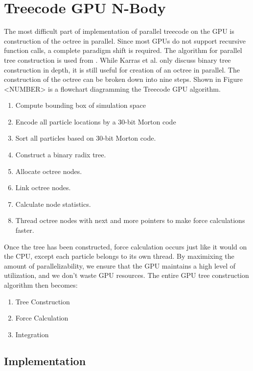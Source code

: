 \documentclass{thesis}
\begin{document}
\section{Treecode GPU N-Body}
The most difficult part of implementation of parallel treecode on the GPU is construction of the octree in parallel. Since most GPUs do not support recursive function calls, a complete paradigm shift is required. The algorithm for parallel tree construction is used from \cite{karras:2012}. While Karras et al. only discuss binary tree construction in depth, it is still useful for creation of an octree in parallel. The construction of the octree can be broken down into nine steps. Shown in Figure <NUMBER> is a flowchart diagramming the Treecode GPU algorithm.
\begin{enumerate}
    \item Compute bounding box of simulation space
    \item Encode all particle locations by a 30-bit Morton code
    \item Sort all particles based on 30-bit Morton code.
    \item Construct a binary radix tree.
    \item Allocate octree nodes.
    \item Link octree nodes.
    \item Calculate node statistics.
    \item Thread octree nodes with next and more pointers to make force calculations faster.
\end{enumerate}
Once the tree has been constructed, force calculation occurs just like it would on the CPU, except each particle belongs to its own thread. By maximixing the amount of parallelizability, we ensure that the GPU maintains a high level of utilization, and we don't waste GPU resources. The entire GPU tree construction algorithm then becomes:
\begin{enumerate}
    \item Tree Construction
    \item Force Calculation
    \item Integration
\end{enumerate}
\subsection{Implementation}
\end{document}
